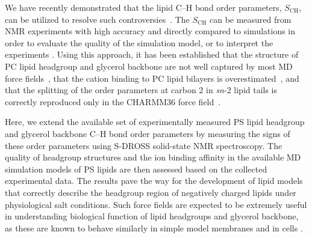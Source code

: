 \documentclass[aps,prl,superscriptaddress,twocolumn]{revtex4}
\begin{document}
We have recently demonstrated that the lipid C--H bond order parameters, $S_\mathrm{CH}$,
can be utilized to resolve such controversies~\cite{botan15,catte16}. The $S_\mathrm{CH}$ can be
measured from NMR experiments with high accuracy and directly compared to simulations
in order to evaluate the quality of the simulation model, or to interpret the experiments \cite{ollila16}. Using this approach,
it has been established that the structure of PC lipid headgroup and glycerol backbone are not well
captured by most MD force fields~\cite{botan15}, that the cation binding to PC
lipid bilayers is overestimated~\cite{catte16}, and that the splitting of the order parameters at
carbon 2 in {\it sn}-2 lipid tails is correctly reproduced only in the CHARMM36 force field~\cite{piggot17}.%
%

Here, we extend the available set of experimentally measured PS lipid headgroup and
glycerol backbone C--H bond order parameters
by measuring the signs of these order parameters using S-DROSS solid-state NMR spectroscopy.
The quality of headgroup structures and the ion binding affinity in
the available MD simulation models of PS lipids are then assessed based on the collected experimental data.
The results pave the way
for the development of lipid models that correctly describe 
the headgroup region of negatively charged lipids under physiological salt
conditions. Such force fields are expected to be extremely useful in understanding
biological function of lipid headgroups and glycerol backbone, as
these are known to behave similarly in simple model membranes and in cells \cite{gally81,scherer87,seelig90}.
\end{document}
